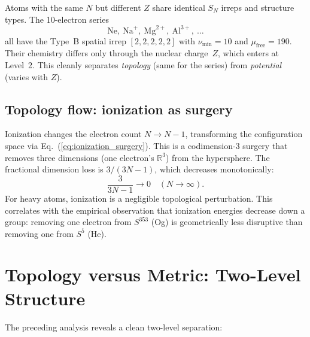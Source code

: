 \documentclass[aps,prl,twocolumn,superscriptaddress,longbibliography]{revtex4-2}
\newcommand{\mufree}{\mu_{\mathrm{free}}}
\begin{document}
Atoms with the same $N$ but different $Z$ share identical $S_N$ irreps
and structure types.  The 10-electron series
\begin{equation}
  \text{Ne},\ \text{Na}^+,\ \text{Mg}^{2+},\ \text{Al}^{3+},\ \ldots
\end{equation}
all have the Type~B spatial irrep $[2,2,2,2,2]$ with $\nu_{\min} = 10$
and $\mufree = 190$.  Their chemistry differs only through the nuclear
charge~$Z$, which enters at Level~2.  This cleanly separates
\emph{topology} (same for the series) from \emph{potential} (varies
with $Z$).

\subsection{Topology flow: ionization as surgery}
\label{sec:topology_flow}

Ionization changes the electron count $N \to N - 1$, transforming the
configuration space via Eq.~(\ref{eq:ionization_surgery}).  This is a
codimension-3 surgery that removes three dimensions (one electron's
$\mathbb{R}^3$) from the hypersphere.  The fractional dimension loss
is $3/(3N-1)$, which decreases monotonically:
\begin{equation}
  \frac{3}{3N - 1} \to 0 \quad (N \to \infty).
\end{equation}
For heavy atoms, ionization is a negligible topological perturbation.
This correlates with the empirical observation that ionization energies
decrease down a group: removing one electron from $S^{353}$ (Og) is
geometrically less disruptive than removing one from $S^5$ (He).


\section{Topology versus Metric: Two-Level Structure}
\label{sec:topology_vs_metric}

The preceding analysis reveals a clean two-level separation:
\end{document}
